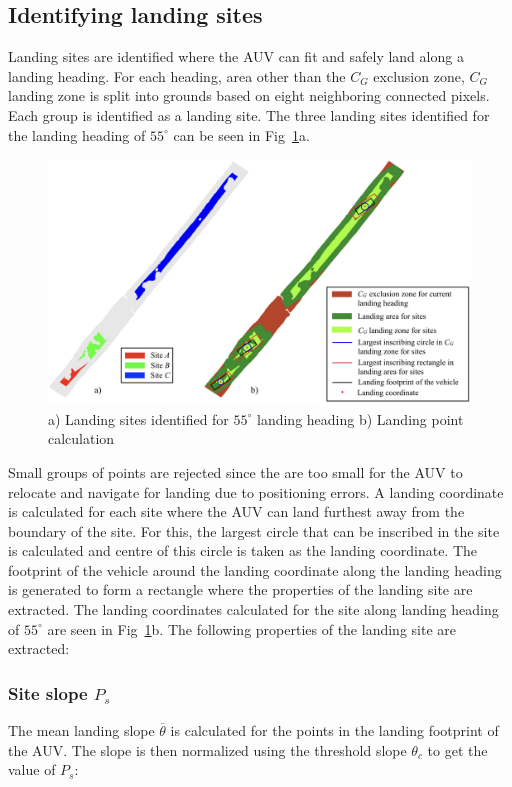 \subsection{Identifying landing sites}

Landing sites are identified where the AUV can fit and safely land along a landing heading. For each heading, area other than the $C_G$ exclusion zone, $C_G$  landing zone is split into grounds based on eight neighboring connected pixels. Each group is identified as a landing site. The three landing sites identified for the landing heading of $55^\circ$ can be seen in Fig~\ref{f:mehul22}a.

\begin{figure}[!ht]
\centering
\includegraphics[width=6in]{./images/mehul22.png}
\caption{a) Landing sites identified for $55^\circ$ landing heading  b) Landing point calculation }
\label{f:mehul22}
\end{figure}

	Small groups of points are rejected since the are too small for the AUV to 
	relocate and navigate for landing due to positioning errors. A landing 
	coordinate is calculated for each site where the AUV can land furthest away 
	from the boundary of the site. For this, the largest circle that can be 
	inscribed in the site is calculated and centre of this circle is taken as 
	the landing coordinate. The footprint of the vehicle around the landing 
	coordinate along the landing heading is generated to form a rectangle where 
	the properties of the landing site are extracted. The landing coordinates 
	calculated for the site along landing heading of $55^\circ$ are seen in 
	Fig~\ref{f:mehul22}b. The following properties of the landing site are 
	extracted:\\
	
\subsubsection{Site slope $P_s$}  The mean landing slope $\overline{\theta}$ is calculated for the points in the landing footprint of the AUV. The slope is then normalized using the threshold slope $\theta_c$ to get the value of $P_s$: 
	
